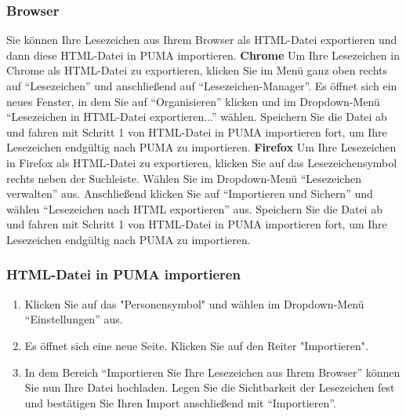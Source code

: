 \documentclass[a4paper,11pt,twoside]{scrbook}
\begin{document}
\subsubsection{Browser}
Sie können Ihre Lesezeichen aus Ihrem Browser als HTML-Datei exportieren und dann diese HTML-Datei in PUMA importieren. 
\newline
\newline
\textbf{Chrome}%
\newline Um Ihre Lesezeichen in Chrome als HTML-Datei zu exportieren, klicken Sie im Menü ganz oben rechts auf \enquote{Lesezeichen} und anschließend auf \enquote{Lesezeichen-Manager}. Es öffnet sich ein neues Fenster, in dem Sie auf \enquote{Organisieren} klicken und im Dropdown-Menü \enquote{Lesezeichen in HTML-Datei exportieren...} wählen. Speichern Sie die Datei ab und fahren mit Schritt 1 von HTML-Datei in PUMA importieren fort, um Ihre Lesezeichen endgültig nach PUMA zu importieren.  
\newline
\newline
\textbf{Firefox}
\newline Um Ihre Lesezeichen in Firefox als HTML-Datei zu exportieren, klicken Sie auf das Lesezeichensymbol rechts neben der Suchleiste. Wählen Sie im Dropdown-Menü \enquote{Lesezeichen verwalten} aus. Anschließend klicken Sie auf \enquote{Importieren und Sichern} und wählen \enquote{Lesezeichen nach HTML exportieren} aus. Speichern Sie die Datei ab und fahren mit Schritt 1 von HTML-Datei in PUMA importieren fort, um Ihre Lesezeichen endgültig nach PUMA zu importieren.  
\subsubsection{HTML-Datei in PUMA importieren}
\begin{enumerate}
    \item Klicken Sie auf das "Personensymbol" und wählen im Dropdown-Menü \enquote{Einstellungen} aus.
    \item Es öffnet sich eine neue Seite. Klicken Sie auf den Reiter "Importieren".
    \item In dem Bereich \enquote{Importieren Sie Ihre Lesezeichen aus Ihrem Browser} können Sie nun Ihre Datei hochladen. Legen Sie die Sichtbarkeit der Lesezeichen fest und bestätigen Sie Ihren Import anschließend mit \enquote{Importieren}.
\end{enumerate}
\end{document}

